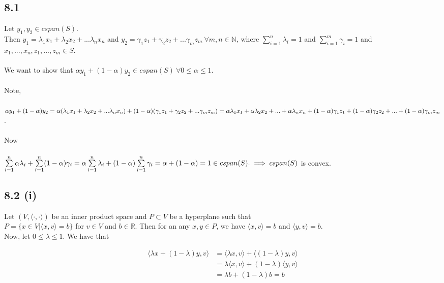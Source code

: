 \documentclass[letterpaper,12pt]{article}
\theoremstyle{definition}
\begin{document}
\subsection*{8.1}


Let $y_1, y_2 \in cspan(S)$.\\
Then $y_1 = \lambda_1 x_1 + \lambda_2 x_2 + ...\lambda_n x_n$ and $y_2 = \gamma_1 z_1 + \gamma_2 z_2 + ... \gamma_m z_m ~ \forall m,n \in \mathbb{N}$, where $\sum\limits_{i=1}^n \lambda_i = 1$ and $\sum\limits_{i=1}^m \gamma_i = 1$ and $x_1, ..., x_n, z_1, ..., z_m \in S$.\\ \\
We want to show that $\alpha y_1 + (1-\alpha) y_2 \in cspan(S)~ \forall 0 \leq \alpha \leq 1$.\\ \\
Note, \\
\\
$\alpha y_1 + (1-\alpha) y_2  = \alpha( \lambda_1 x_1 + \lambda_2 x_2 + ...\lambda_n x_n) + (1-\alpha)(\gamma_1 z_1 + \gamma_2 z_2 + ... \gamma_m z_m)\\ \\
 = \alpha \lambda_1 x_1 +\alpha  \lambda_2 x_2 + ... + \alpha \lambda_n x_n +
 (1-\alpha ) \gamma_1 z_1 + (1-\alpha)  \gamma_2 z_2 + ... + (1-\alpha) \gamma_m z_m$.\\ \\
Now \\ 
\\$\sum\limits_{i=1}^n \alpha \lambda_i + \sum\limits_{i=1}^n (1-\alpha) \gamma_i = 
\alpha \sum\limits_{i=1}^n  \lambda_i + (1-\alpha) \sum\limits_{i=1}^n \gamma_i = \alpha + (1-\alpha) = 1 \in cspan(S).\\
\\
\implies cspan(S)$ is convex.

\subsection*{8.2 (i)} 
Let $(V, \langle \cdot, \cdot \rangle)$ be an inner product space and $P\subset V$ be a hyperplane such that\\ 
$P = \{ x \in V | \langle x, v \rangle = b \}$ for $v\in V$ and $b \in \mathds{R}$. Then for an any $x,y \in P$, we have $\langle x,v \rangle = b$ and $\langle y,v \rangle = b$. \\
Now, let $ 0 \leq \lambda \leq 1$. We have that 

\begin{align*}
\langle \lambda x + (1-\lambda)y,v \rangle &= \langle \lambda x, v \rangle + \langle (1-\lambda)y, v \rangle \\
 &= \lambda \langle x,v \rangle + (1-\lambda)\langle y,v \rangle \\
 &= \lambda b + (1-\lambda)b = b 
\end{align*}
\end{document}
